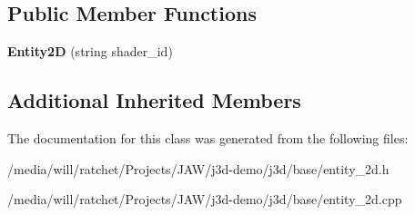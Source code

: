 \subsection*{Public Member Functions}
\begin{DoxyCompactItemize}
\item 
\hypertarget{classj3d_1_1base_1_1Entity2D_a52e01c12eec7f7fab6fdec3889e032e7}{}{\bfseries Entity2\+D} (string shader\+\_\+id)\label{classj3d_1_1base_1_1Entity2D_a52e01c12eec7f7fab6fdec3889e032e7}

\end{DoxyCompactItemize}
\subsection*{Additional Inherited Members}


The documentation for this class was generated from the following files\+:\begin{DoxyCompactItemize}
\item 
/media/will/ratchet/\+Projects/\+J\+A\+W/j3d-\/demo/j3d/base/entity\+\_\+2d.\+h\item 
/media/will/ratchet/\+Projects/\+J\+A\+W/j3d-\/demo/j3d/base/entity\+\_\+2d.\+cpp\end{DoxyCompactItemize}

